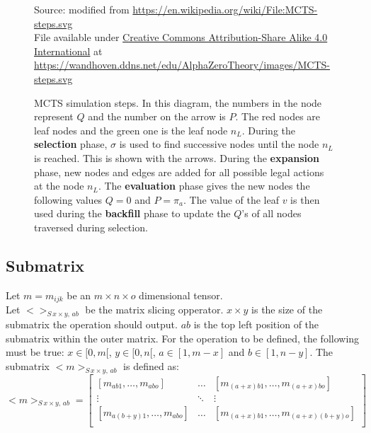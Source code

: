 \documentclass[12pt]{article}
\newcommand{\source}[1]{\caption*{Source: {#1}} }
\begin{document}
\begin{figure}
    \centering
	\captionsetup{width=.9\linewidth}
    
		\caption[width=0.7\columnwidth]{MCTS simulation steps. In this diagram, the numbers in the node represent \(Q\) and the number on the arrow is \(P\). The red nodes are leaf nodes and the green one is the leaf node \(n_L\). During the \textbf{selection} phase, \(\sigma\) is used to find successive nodes until the node \(n_L\) is reached. This is shown with the arrows. During the \textbf{expansion} phase, new nodes and edges are added for all possible legal actions at the node \(n_L\). The \textbf{evaluation} phase gives the new nodes the following values \(Q = 0\) and \(P = \pi_a\). The value of the leaf \(v\) is then used during the \textbf{backfill} phase to update the \(Q\)'s of all nodes traversed during selection.}
		\source{modified from \url{https://en.wikipedia.org/wiki/File:MCTS-steps.svg}\\File available under \href{https://creativecommons.org/licenses/by-sa/4.0/deed.en}{Creative Commons Attribution-Share Alike 4.0 International} at \url{https://wandhoven.ddns.net/edu/AlphaZeroTheory/images/MCTS-steps.svg}}
	\label{MCTS-simulation}
\end{figure}

\subsection{Submatrix}
\label{sec:Ref:submatrix}
Let \(m = m_{ijk}\) be an \(m\times n\times o\) dimensional tensor.\\
Let \(<>_{S\,x\times y,\,ab}\) be the matrix slicing opperator. \(x\times y\) is the size of the submatrix the operation should output. \(ab\) is the top left position of the submatrix within the outer matrix.  For the operation to be defined, the following must be true: \(x \in \mathbb [0, m[\), \(y \in \mathbb [0, n[\), \(a  \in [1, m-x]\) and \(b \in [1, n-y]\). The submatrix \(<m>_{S\,x\times y,\,ab}\) is defined as:
\[
<m>_{S\,x\times y,\,ab} = 
\left[
\begin{matrix}
[m_{ab1},\dots,m_{abo}] & \dots & [m_{(a+x)b1},\dots,m_{(a+x)bo}]\\
\vdots &  \ddots & \vdots\\
[m_{a(b+y)1},\dots,m_{abo}] & \dots & [m_{(a+x)b1},\dots,m_{(a+x)(b+y)o}]\\
\end{matrix}\right]
\]
\end{document}
